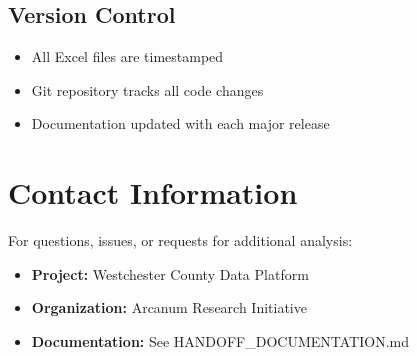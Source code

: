 \documentclass[11pt,letterpaper]{article}
\begin{document}
\subsection{Version Control}
\begin{itemize}
    \item All Excel files are timestamped
    \item Git repository tracks all code changes
    \item Documentation updated with each major release
\end{itemize}

\section{Contact Information}

For questions, issues, or requests for additional analysis:
\begin{itemize}
    \item \textbf{Project:} Westchester County Data Platform
    \item \textbf{Organization:} Arcanum Research Initiative
    \item \textbf{Documentation:} See HANDOFF\_DOCUMENTATION.md
\end{itemize}
\end{document}
